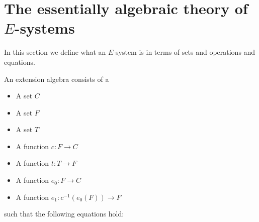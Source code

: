 \section{The essentially algebraic theory of $E$-systems}

In this section we define what an $E$-system is in terms of sets and operations
and equations.

\begin{defn}
An extension algebra consists of a 
\begin{itemize}
\item A set $C$
\item A set $F$
\item A set $T$
\item A function $c:F\to C$
\item A function $t:T\to F$
\item A function $e_0:F\to C$
\item A function $e_1:c^{-1}(e_0(F))\to F$
\end{itemize}
such that the following equations hold:
\end{defn}
